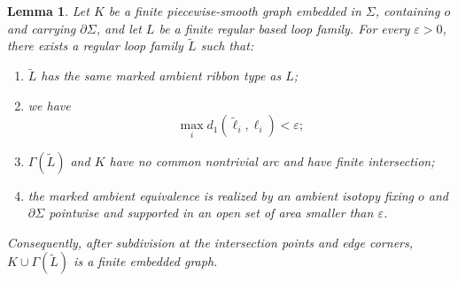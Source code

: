 \documentclass[11pt,a4paper,reqno]{article}
\newtheorem{lemma}[theorem]{Lemma}
\theoremstyle{definition}
\theoremstyle{remark}
\begin{document}
\begin{lemma}\label{lem:relative-general-position-graphs}
Let $K$ be a finite piecewise-smooth graph embedded in $\Sigma$, containing $o$ and carrying $\partial\Sigma$, and let $L$ be a finite regular based loop family. For every $\varepsilon>0$, there exists a regular loop family $\widetilde L$ such that:
\begin{enumerate}
\item $\widetilde L$ has the same marked ambient ribbon type as $L$;
\item we have
\[
 \max_i d_1(\widetilde\ell_i,\ell_i)<\varepsilon;
\]
\item $\Gamma(\widetilde L)$ and $K$ have no common nontrivial arc and have finite intersection;
\item the marked ambient equivalence is realized by an ambient isotopy fixing $o$ and $\partial\Sigma$ pointwise and supported in an open set of area smaller than $\varepsilon$.
\end{enumerate}
Consequently, after subdivision at the intersection points and edge corners, $K\cup\Gamma(\widetilde L)$ is a finite embedded graph.
\end{lemma}
\end{document}
